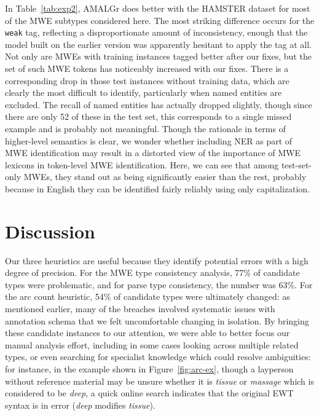 \documentclass[output=paper
,modfonts
,nonflat]{langsci/langscibook}
\newcommand{\lex}[1]{\textit{#1}\xspace}
\newcommand{\mwetype}[1]{\texttt{#1}\xspace}
\newcommand{\weak}{\mwetype{weak}}
\newcommand{\figureref}[1]{Figure~\ref{#1}\xspace}
\newcommand{\tableref}[1]{Table~\ref{#1}\xspace}
\begin{document}
In \tableref{tab:exp2}, AMALGr does better with the HAMSTER dataset for most of the MWE subtypes considered here. The most striking difference occurs for the \weak tag, reflecting a disproportionate amount of inconsistency, enough that the model built on the earlier version was apparently hesitant to apply the tag at all. Not only are MWEs with training instances tagged better after our fixes, but the set of such MWE tokens has noticeably increased with our fixes. There is a corresponding drop in those test instances without training data, which are clearly the most difficult to identify, particularly when named entities are excluded. The recall of named entities has actually dropped slightly, though since there are only 52 of these in the test set, this corresponds to a single missed example and is probably not meaningful. Though the rationale in terms of higher-level semantics is clear, we wonder whether including NER as part of MWE identification may result in a distorted view of the importance of MWE lexicons in token-level MWE identification. Here, we can see that among test-set-only MWEs, they stand out as being significantly easier than the rest, probably because in English they can be identified fairly reliably using only capitalization.

\section{Discussion}

Our three heuristics are useful because they identify potential errors with a high degree of precision. For the MWE type consistency analysis, 77\% of candidate types were problematic, and for parse type consistency, the number was 63\%. For the arc count heuristic, 54\% of candidate types were ultimately changed: as mentioned earlier, many of the breaches involved systematic issues with annotation schema that we felt uncomfortable changing in isolation. By bringing these candidate instances to our attention, we were able to better focus our manual analysis effort, including in some cases looking across multiple related types, or even searching for specialist knowledge which could resolve ambiguities: for instance, in the example shown in \figureref{fig:arc-ex}, though a layperson without reference material may be unsure whether it is \lex{tissue} or \lex{massage} which is considered to be \lex{deep}, a quick online search indicates that the original EWT syntax is in error (\lex{deep} modifies \lex{tissue}).
\end{document}
